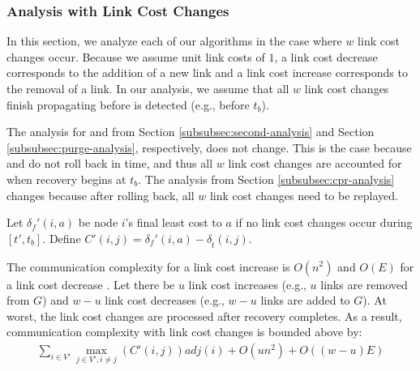 {{\subsubsection{Analysis with Link Cost Changes}
\label{subsubsec:linkchange-complex}


In this section, we analyze each of our algorithms in the case where $w$ link cost changes occur.  Because we assume unit link costs of $1$, a link cost decrease corresponds to the 
addition of a new link and a link cost increase corresponds to the removal of a link.  In our analysis, we assume that all $w$ link cost changes finish propagating before \bad is detected 
(e.g., before $t_b$).

The analysis for \second and \purge from Section \ref{subsubsec:second-analysis} and Section \ref{subsubsec:purge-analysis}, respectively, does not change.  This is the 
case because \second and \purge do not roll back in time, and thus all $w$ link cost changes are accounted for when recovery begins at $t_b$.  
The \cpr analysis from Section \ref{subsubsec:cpr-analysis} changes because after rolling back, all $w$ link cost changes need to be replayed. 

Let $\delta_{f}'(i,a)$ be node $i$'s final least cost to $a$ if no link cost changes occur during $[t',t_b]$.  Define 
$C'(i,j) = \delta_{f}'(i,a) - \delta_{\hat{t}}(i,j)$.

The communication complexity for a link cost increase is $O(n^2)$ \cite{Johnson84} and $O(E)$ for a link cost decrease \cite{Johnson84b}.  Let there be $u$ link cost increases (e.g., $u$ links are 
removed from $G$) and $w-u$ link cost decreases (e.g., $w-u$ links are added to $G$).
At worst, the link cost changes are processed after \bad recovery completes. As a result, \cpr communication complexity with link cost changes is bounded above by:
\begin{eqnarray}
\label{thm:cpr-link-change}
\sum_{i \in V'} \max_{j \in V', i \neq j} \left( C'(i,j) \right) adj(i) + O(un^2) + O\left((w-u)E\right)
\end{eqnarray}


}}
